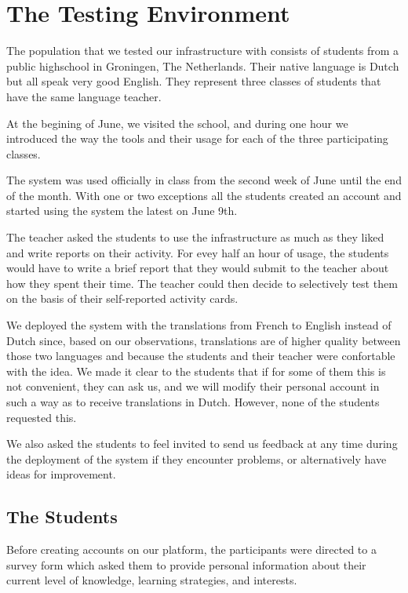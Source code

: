 
\newpage
\section{The Testing Environment}

The population that we tested our infrastructure with consists of \stcnt  students from a public highschool in Groningen, The Netherlands. Their native language is Dutch but all speak very good English. They represent three classes of students that have the same language teacher.

At the begining of June, we visited the school, and during one hour we introduced the way the tools and their usage for each of the three participating classes.

The system was used officially in class from the second week of June until the end of the month. With one or two exceptions all the students created an account and started using the system the latest on June 9th. 

The teacher asked the students to use the infrastructure as much as they liked and write reports on their activity. For evey half an hour of usage, the students would have to write a brief report that they would submit to the teacher about how they spent their time. The teacher could then decide to selectively test them on the basis of their self-reported activity cards.

We deployed the system with the translations from French to English instead of Dutch since, based on our observations, translations are of higher quality between those two languages and because the students and their teacher were confortable with the idea. We made it clear to the students that if for some of them this is not convenient, they can ask us, and we will modify their personal account in such a way as to receive translations in Dutch. However, none of the students requested this.

We also asked the students to feel invited to send us feedback at any time during the deployment of the system if they encounter problems, or alternatively have ideas for improvement.

\subsection{The Students}

Before creating accounts on our platform, the participants were directed to a survey form which asked them to provide personal information about their current level of knowledge, learning strategies, and interests. 

